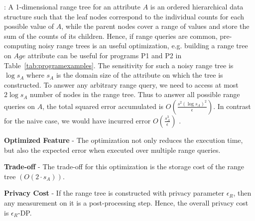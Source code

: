:
A 1-dimensional range tree for an attribute $A$ is an ordered hierarchical data structure such that the leaf nodes correspond to the individual counts for each possible value of $A$, while the parent nodes cover a range of values and store the sum of the counts of its children. Hence, if range queries are common, pre-computing noisy range trees is an useful optimization, e.g. building a range tree on $Age$ attribute can be useful for programs P1 and P2 in Table~\ref{tab:programexamples}. The sensitivity for  such a noisy range tree is $\log s_A$ where $s_A$ is the domain size of the attribute on which the tree is constructed. To answer any arbitrary range query, we need to access at most $2\log s_A$ number of nodes in the range tree. Thus to answer all possible range queries on $A$, the total squared error accumulated is $O(\frac{s^2(\log s_A)^2 }{\epsilon})$. In contrast for the naive case, we would have incurred error $O(\frac{s_A^3}{\epsilon})$ \cite{cdf}. %





\squishlist
\item \textbf{Optimized Feature} - The optimization not only reduces the execution time, but also the expected error when executed over multiple range queries.
\item \textbf{Trade-off} - The trade-off for this optimization is the storage cost of the range tree $(O(2\cdot s_A))$.
\item \textbf{Privacy Cost} - If the range tree is constructed  with privacy parameter $\epsilon_R$, then any measurement on it is a post-processing step. Hence, the overall privacy cost is $\epsilon_R$-DP.
\squishend

